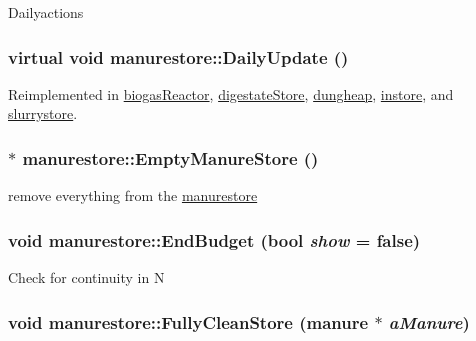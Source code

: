 \label{classmanurestore_a9305e9ead062b785f642bc3a8a5130d3}
Dailyactions \hypertarget{classmanurestore_a6eb8d6bedf9b0732423bfbb98d5da453}{
\subsubsection[{DailyUpdate}]{\setlength{\rightskip}{0pt plus 5cm}virtual void manurestore::DailyUpdate ()}}
\label{classmanurestore_a6eb8d6bedf9b0732423bfbb98d5da453}


Reimplemented in \hyperlink{classbiogas_reactor_ae8242ee2ab7dd6495125af9720b54aa4}{biogasReactor}, \hyperlink{classdigestate_store_a209611f25ea14ad07c9de42fa46eea05}{digestateStore}, \hyperlink{classdungheap_ab901a0eba5e5cb9164042bbfad350435}{dungheap}, \hyperlink{classinstore_a3235daf3842bf6c4b1e30f56167e69c1}{instore}, and \hyperlink{classslurrystore_a0e660eb43b403bef8aaefb8188a73d4f}{slurrystore}.\hypertarget{classmanurestore_a5609cf626143da62c4043487d00f3354}{
\subsubsection[{EmptyManureStore}]{ $\ast$ manurestore::EmptyManureStore ()}}
\label{classmanurestore_a5609cf626143da62c4043487d00f3354}
remove everything from the \hyperlink{classmanurestore}{manurestore} \hypertarget{classmanurestore_aedd7bc72a5ce5d60612c29218cdc1753}{
\subsubsection[{EndBudget}]{\setlength{\rightskip}{0pt plus 5cm}void manurestore::EndBudget (bool {\em show} = {\ttfamily false})}}
\label{classmanurestore_aedd7bc72a5ce5d60612c29218cdc1753}
Check for continuity in N \hypertarget{classmanurestore_a079653ec01b9b278a16e9f03eccd73e9}{
\subsubsection[{FullyCleanStore}]{\setlength{\rightskip}{0pt plus 5cm}void manurestore::FullyCleanStore ({\bf manure} $\ast$ {\em aManure})}}
